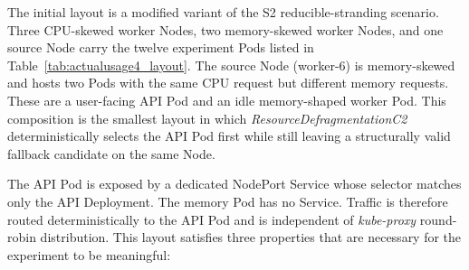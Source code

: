 The initial layout is a modified variant of the S2 reducible-stranding scenario. Three CPU-skewed worker Nodes, two memory-skewed worker Nodes, and one source Node carry the twelve experiment Pods listed in Table~\ref{tab:actualusage4_layout}. The source Node (worker-6) is memory-skewed and hosts two Pods with the same CPU request but different memory requests. These are a user-facing API Pod and an idle memory-shaped worker Pod. This composition is the smallest layout in which \textit{ResourceDefragmentationC2} deterministically selects the API Pod first while still leaving a structurally valid fallback candidate on the same Node.

\begin{table}[H]
    \centering
    \caption{Initial Pod Placement for the Actual Usage Eviction Test}
    \label{tab:actualusage4_layout}
    \renewcommand{\arraystretch}{1.2}
\end{table}

The API Pod is exposed by a dedicated NodePort Service whose selector matches only the API Deployment. The memory Pod has no Service. Traffic is therefore routed deterministically to the API Pod and is independent of \textit{kube-proxy} round-robin distribution. This layout satisfies three properties that are necessary for the experiment to be meaningful:

